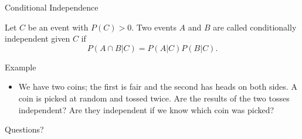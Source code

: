 \documentclass[t]{beamer}
\begin{document}
\begin{frame}{Conditional Independence}
  \footnotesize
  \pause
  \begin{definition}[]
    Let $C$ be an event with $P(C) > 0$. Two events $A$ and $B$ are called conditionally independent given $C$ if
      \begin{equation*}
        P(A \cap B | C) = P(A | C)P(B | C).
      \end{equation*}
  \end{definition}
  \pause
  \begin{block}{Example}
    \begin{itemize}
      \item \pause We have two coins; the first is fair and the second has heads on both sides. A coin is picked at random and tossed twice. Are the results of the two tosses independent? \pause Are they independent if we know which coin was picked?
    \end{itemize}
  \end{block}
  \normalsize
\end{frame}

\begin{frame}{}
\vfill
\begin{center}
Questions?
\end{center}
\vfill
\end{frame}
\end{document}
